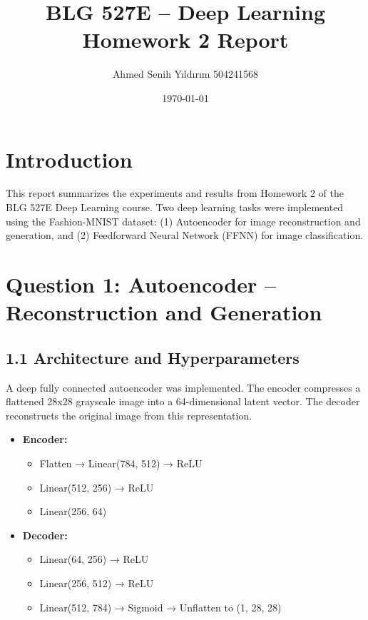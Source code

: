 \documentclass[12pt]{article}
\title{BLG 527E – Deep Learning \\ Homework 2 Report}
\author{Ahmed Senih Yıldırım  504241568}
\date{\today}
\begin{document}
\maketitle

\section*{Introduction}

This report summarizes the experiments and results from Homework 2 of the BLG 527E Deep Learning course. Two deep learning tasks were implemented using the Fashion-MNIST dataset: (1) Autoencoder for image reconstruction and generation, and (2) Feedforward Neural Network (FFNN) for image classification.

\section*{Question 1: Autoencoder – Reconstruction and Generation}

\subsection*{1.1 Architecture and Hyperparameters}

A deep fully connected autoencoder was implemented. The encoder compresses a flattened 28x28 grayscale image into a 64-dimensional latent vector. The decoder reconstructs the original image from this representation.

\begin{itemize}
    \item \textbf{Encoder:}
    \begin{itemize}
        \item Flatten → Linear(784, 512) → ReLU
        \item Linear(512, 256) → ReLU
        \item Linear(256, 64)
    \end{itemize}
    \item \textbf{Decoder:}
    \begin{itemize}
        \item Linear(64, 256) → ReLU
        \item Linear(256, 512) → ReLU
        \item Linear(512, 784) → Sigmoid → Unflatten to (1, 28, 28)
    \end{itemize}
\end{itemize}
\end{document}
